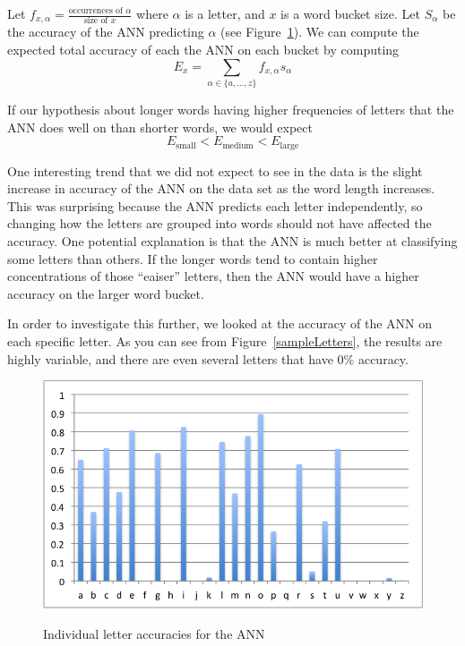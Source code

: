 \documentclass[11pt,a4paper,twocolumn]{article}
\begin{document}
Let $f_{x,\alpha}=\frac{\textrm{occurrences of }\alpha}{\textrm{size of }x}$
where $\alpha$ is a letter, and $x$ is a word bucket size. Let $S_\alpha$ be
the accuracy of the ANN predicting $\alpha$ (see Figure~\ref{fig:letterAccuracies}). We can compute the
expected total accuracy of each the ANN on each bucket by computing
\begin{equation}
E_x = \sum_{\alpha \in \{a,\ldots, z\}}f_{x,\alpha} s_\alpha
\end{equation}

If our hypothesis about longer words having higher frequencies of letters that the ANN does well on than shorter words, we would expect 
\begin{equation*}
E_{\textrm{small}} < E_{\textrm{medium}} < E_{\textrm{large}}
\end{equation*}


One interesting trend that we did not expect to see in the data is the slight increase in accuracy
of the ANN on the data set as the word length increases. This was surprising because the ANN
predicts each letter independently, so changing how the letters are grouped into words should not
have affected the accuracy. One potential explanation is that the ANN is much better at classifying
some letters than others. If the longer words tend to contain higher concentrations of those
``eaiser'' letters, then the ANN would have a higher accuracy on the larger word bucket. 

In order to investigate this further, we looked at the accuracy of the ANN on each specific letter.
As you can see from Figure~\ref{sampleLetters}, the results are highly variable, and there are even several letters
that have 0\% accuracy.

\begin{figure}[h]
\centering
\caption{Individual letter accuracies for the ANN}
\includegraphics[scale=0.55]{img/letterPercentages.png}
\label{fig:letterAccuracies}
\end{figure} 
\end{document}

